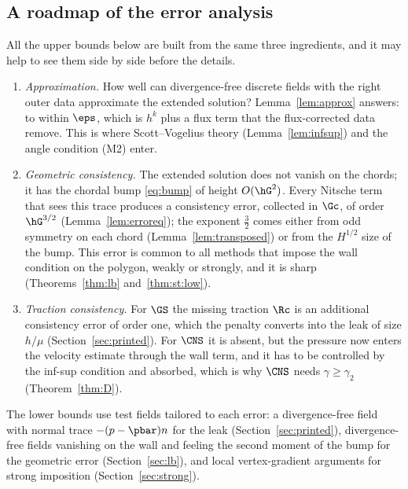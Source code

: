 \subsection{A roadmap of the error analysis}
All the upper bounds below are built from the same three ingredients, and it may help to see them side by side before the details.
\begin{enumerate}[label=(\roman*)]
\item \emph{Approximation.} How well can divergence-free discrete fields with the right outer data approximate the extended solution? Lemma~\ref{lem:approx} answers: to within $\eps$, which is $h^k$ plus a flux term that the flux-corrected data remove. This is where Scott--Vogelius theory (Lemma~\ref{lem:infsup}) and the angle condition (M2) enter.
\item \emph{Geometric consistency.} The extended solution does not vanish on the chords; it has the chordal bump \eqref{eq:bump} of height $O(\hG^2)$. Every Nitsche term that sees this trace produces a consistency error, collected in $\Gc$, of order $\hG^{3/2}$ (Lemma~\ref{lem:erroreq}); the exponent $\frac32$ comes either from odd symmetry on each chord (Lemma~\ref{lem:transposed}) or from the $H^{1/2}$ size of the bump. This error is common to all methods that impose the wall condition on the polygon, weakly or strongly, and it is sharp (Theorems~\ref{thm:lb} and~\ref{thm:st:low}).
\item \emph{Traction consistency.} For $\GS$ the missing traction $\Rc$ is an additional consistency error of order one, which the penalty converts into the leak of size $h/\mu$ (Section~\ref{sec:printed}). For $\CNS$ it is absent, but the pressure now enters the velocity estimate through the wall term, and it has to be controlled by the inf-sup condition and absorbed, which is why $\CNS$ needs $\gamma\ge\gamma_2$ (Theorem~\ref{thm:D}).
\end{enumerate}
The lower bounds use test fields tailored to each error: a divergence-free field with normal trace $-(p-\pbar)n$ for the leak (Section~\ref{sec:printed}), divergence-free fields vanishing on the wall and feeling the second moment of the bump for the geometric error (Section~\ref{sec:lb}), and local vertex-gradient arguments for strong imposition (Section~\ref{sec:strong}).
